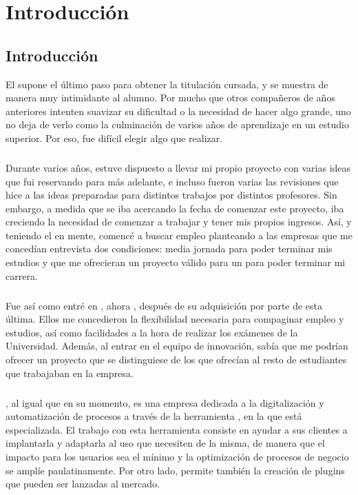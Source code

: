 \documentclass{subfiles}
\begin{document}
    \chapter{Introducción}
    \label{chap:1}

        \section{Introducción}
        \label{sec:introduccion}

        {El \TFG supone el último paso para obtener la titulación cursada, y se muestra de manera muy intimidante al alumno. Por mucho que otros compañeros de años anteriores intenten suavizar su dificultad o la necesidad de hacer algo grande, uno no deja de verlo como la culminación de varios años de aprendizaje en un estudio superior. Por eso, fue difícil elegir algo que realizar.}
      
        \paragraph{}
        {Durante varios años, estuve dispuesto a llevar mi propio proyecto con varias ideas que fui reservando para más adelante, e incluso fueron varias las revisiones que hice a las ideas preparadas para distintos trabajos por distintos profesores. Sin embargo, a medida que se iba acercando la fecha de comenzar este proyecto, iba creciendo la necesidad de comenzar a trabajar y tener mis propios ingresos. Así, y teniendo el \TFG en mente, comencé a buscar empleo planteando a las empresas que me concedían entrevista dos condiciones: media jornada para poder terminar mis estudios y que me ofrecieran un proyecto válido para un \tfg para poder terminar mi carrera.}
      
        \paragraph{}
        {Fue así como entré en \silverstorm, ahora \thirdera, después de su adquisición por parte de esta última. Ellos me concedieron la flexibilidad necesaria para compaginar empleo y estudios, así como facilidades a la hora de realizar los exámenes de la Universidad. Además, al entrar en el equipo de innovación, sabía que me podrían ofrecer un proyecto que se distinguiese de los que ofrecían al resto de estudiantes que trabajaban en la empresa.}

        \paragraph{}
        {\thirdera, al igual que \silverstorm en su momento, es una empresa dedicada a la digitalización y automatización de procesos a través de la herramienta \servicenow, en la que está especializada. El trabajo con esta herramienta consiste en ayudar a sus clientes a implantarla y adaptarla al uso que necesiten de la misma, de manera que el impacto para los usuarios sea el mínimo y la optimización de procesos  de negocio se amplíe paulatinamente. Por otro lado, \servicenow permite también la creación de plugins que pueden ser lanzadas al mercado.}
\end{document}
